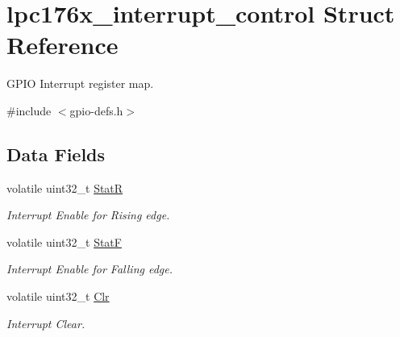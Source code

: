 \hypertarget{structlpc176x__interrupt__control}{}\section{lpc176x\+\_\+interrupt\+\_\+control Struct Reference}
\label{structlpc176x__interrupt__control}


G\+P\+IO Interrupt register map.  




{\ttfamily \#include $<$gpio-\/defs.\+h$>$}

\subsection*{Data Fields}
\begin{DoxyCompactItemize}
\item 
\mbox{\label{structlpc176x__interrupt__control_afaa07912e1c7ff5ce086dd6586465741}} 
volatile uint32\+\_\+t \mbox{\hyperlink{structlpc176x__interrupt__control_afaa07912e1c7ff5ce086dd6586465741}{StatR}}
\begin{DoxyCompactList}\small\item\em Interrupt Enable for Rising edge. \end{DoxyCompactList}\item 
\mbox{\label{structlpc176x__interrupt__control_ad685250d9326bf62c3525b50c2e7f22d}} 
volatile uint32\+\_\+t \mbox{\hyperlink{structlpc176x__interrupt__control_ad685250d9326bf62c3525b50c2e7f22d}{StatF}}
\begin{DoxyCompactList}\small\item\em Interrupt Enable for Falling edge. \end{DoxyCompactList}\item 
\mbox{\label{structlpc176x__interrupt__control_acbbfc7c5dd1aa286b7bda2bc708a9e74}} 
volatile uint32\+\_\+t \mbox{\hyperlink{structlpc176x__interrupt__control_acbbfc7c5dd1aa286b7bda2bc708a9e74}{Clr}}
\begin{DoxyCompactList}\small\item\em Interrupt Clear. \end{DoxyCompactList}\item 
\mbox{\label{structlpc176x__interrupt__control_a5c918bbf43bc302c0c49b32302491259}} 

\end{DoxyCompactItemize}
